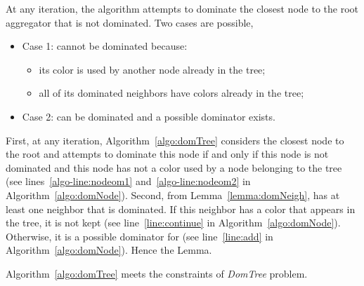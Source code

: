 \endproof

\begin{lemma}\label{lemma:undominated}
At any iteration, the algorithm attempts to dominate the closest node  to the root aggregator that is not dominated. Two cases are possible,
\begin{itemize}
\item Case 1:  cannot be dominated because:
	\begin{itemize}
	\item its color is used by another node already in the tree;
	\item all of its dominated neighbors have colors already in the tree;
	\end{itemize}

\item Case 2:  can be dominated and a possible dominator exists.
\end{itemize}
\end{lemma}

\proof
First, at any iteration, Algorithm~\ref{algo:domTree} considers the closest node  to the root and attempts to dominate this node if and only if this node is not dominated and this node has not a color used by a node belonging to the tree (see lines~\ref{algo-line:nodeom1} and~\ref{algo-line:nodeom2} in Algorithm~\ref{algo:domNode}).
Second, from Lemma~\ref{lemma:domNeigh},  has at least one neighbor that is dominated. If this neighbor has a color that appears in the tree, it is not kept (see line~\ref{line:continue} in Algorithm~\ref{algo:domNode}). Otherwise, it is a possible dominator for  (see line~\ref{line:add} in Algorithm~\ref{algo:domNode}). Hence the Lemma.\endproof



\begin{theorem}\label{theo:trueAlgo}
Algorithm~\ref{algo:domTree} meets the constraints of \textit{DomTree} problem.\end{theorem}

